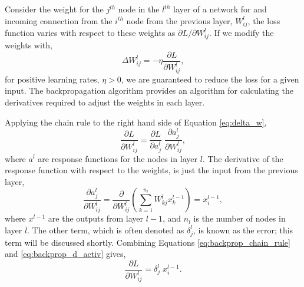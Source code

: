 Consider the weight for the $j^{th}$ node in the $l^{th}$ layer of a network for
and incoming connection from the $i^{th}$ node from the previous layer, 
$W^l_{ij}$, the loss function varies with respect to these weights as 
$\partial L/\partial W^l_{ ij }$. If we modify the weights with, 
\begin{equation} 
	\Delta W^l_{ ij } = -\eta \frac{\partial L}{\partial W^l_{ ij }},
	\label{eq:delta_w}
\end{equation}
for positive learning rates, $\eta > 0$, we are guaranteed to reduce the loss
for a given input. The backpropagation algorithm provides an algorithm for 
calculating the derivatives required to adjust the weights in each layer.

Applying the chain rule to the right hand side of Equation \ref{eq:delta_w},
\begin{equation}
	\frac{\partial L}{\partial W^l_{ij}} = \frac{\partial L}{\partial a^l_j} \;
	\frac{\partial a^l_j}{\partial W^l_{ij}},
	\label{eq:backprop_chain_rule}
\end{equation}
where $a^l$ are response functions for the nodes in layer $l$. The derivative 
of the response function with respect to the weights, is just the input from the
previous layer,
\begin{equation}
	\frac{\partial a^l_j}{\partial W^l_{ij}} = \frac{\partial}{\partial W^l_{ij}}
	\left( \sum_{k = 1}^{n_l} W^l_{kj} x^{l-1}_{k} \right) = x^{l-1}_i,
	\label{eq:backprop_d_activ}
\end{equation}
where $x^{l-1}$ are the outputs from layer $l-1$, and $n_l$ is the number of 
nodes in layer $l$. The other term, which is often denoted as $\delta^l_j$, is 
known as the error; this term will be discussed shortly. Combining Equations 
\ref{eq:backprop_chain_rule} and \ref{eq:backprop_d_activ} gives,
\begin{equation*}
	\frac{\partial L}{\partial W^l_{ij}} = \delta^l_j \; x^{l-1}_i.
\end{equation*}

